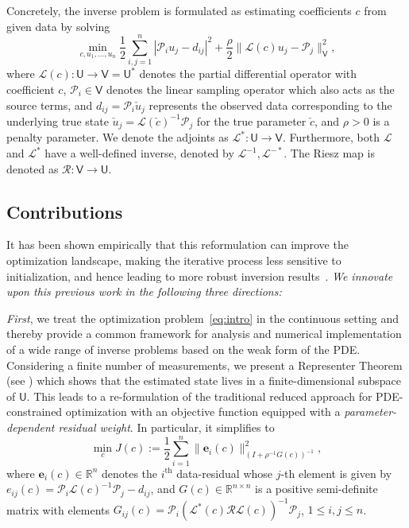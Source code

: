 \documentclass[12pt]{amsart}
\newcommand{\V}{\mathsf{V}}
\newcommand{\yy}[1]{\textcolor{blue}{{YY: #1}}}
\begin{document}
Concretely, the inverse problem is formulated as estimating coefficients $c$ from given data by solving
\begin{equation}\label{eq:intro}
\min_{c,u_1, \ldots, u_n} {\textstyle{\frac{1}{2}}}\sum_{i,j=1}^n |\mathcal{P}_iu_j - d_{ij}|^2 +  {\textstyle{\frac{\rho}{2}}}\|\mathcal{L}(c)u_j - \mathcal{P}_j\|_\mathsf{V}^2,
\end{equation}
where $\mathcal{L}(c):\mathsf{U}\rightarrow\mathsf{V} = \mathsf{U}^*$ denotes the partial differential operator with coefficient $c$, $\mathcal{P}_i\in \V$ denotes the linear sampling operator which also acts as the source terms, and $d_{ij} = \mathcal{P}_i\check{u}_j$ represents the observed data corresponding to the underlying true state $\check{u}_j = \mathcal{L}(\check{c})^{-1}\mathcal{P}_j$ for the true parameter $\check{c}$, and $\rho > 0$ is a penalty parameter. We denote the adjoints as $\mathcal{L}^* : \mathsf{U}\rightarrow\mathsf{V}$. Furthermore, both $\mathcal{L}$ and $\mathcal{L}^*$ have a well-defined inverse, denoted by $\mathcal{L}^{-1}, \mathcal{L}^{-*}$. The Riesz map is denoted as $\mathcal{R}:\mathsf{V}\rightarrow\mathsf{U}$.

\subsection{Contributions}
It has been shown empirically that this reformulation can improve the optimization landscape, making the iterative process less sensitive to initialization, and hence leading to more robust inversion results~\cite{van2015penalty}. \emph{We innovate upon this previous work in the following three directions:}

\emph{First}, we treat the optimization problem~\eqref{eq:intro} in the continuous setting and thereby provide a common framework for analysis and numerical implementation of a wide range of inverse problems based on the weak form of the PDE. Considering a finite number of measurements, we present a Representer Theorem (see ) which shows that the estimated state lives in a finite-dimensional subspace of $\mathsf{U}$. This leads to a re-formulation of the traditional reduced approach for PDE-constrained optimization with an objective function equipped with a \textit{parameter-dependent residual weight}. In particular, it simplifies to
\[
\min_c  J(c):={\textstyle{\frac{1}{2}}}\sum_{i=1}^n\|\mathbf{e}_i(c)\|_{(I + \rho^{-1} G(c))^{-1}}^2,
\]
where $\mathbf{e}_i(c) \in \mathbb{R}^n$ denotes the $i^\text{th}$ data-residual whose $j$-th element is given by $e_{ij}(c) = \mathcal{P}_i\mathcal{L}(c)^{-1}\mathcal{P}_j- d_{ij}$, and $G(c)\in \mathbb{R}^{n\times n}$ is a positive semi-definite matrix with elements $G_{ij}(c) = \mathcal{P}_i\left(\mathcal{L}^*(c)\mathcal{R}\mathcal{L}(c)\right)^{-1}\mathcal{P}_j$, $1\leq i,j\leq n$. %
\end{document}
